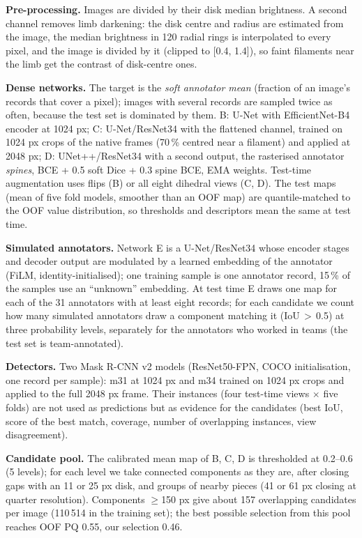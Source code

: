 \documentclass[sigconf]{acmart}
\begin{document}
\textbf{Pre-processing.} Images are divided by their disk median brightness. A second channel removes limb darkening: the disk centre and radius are estimated from the image, the median brightness in 120 radial rings is interpolated to every pixel, and the image is divided by it (clipped to [0.4, 1.4]), so faint filaments near the limb get the contrast of disk-centre ones.

\textbf{Dense networks.} The target is the \emph{soft annotator mean} (fraction of an image's records that cover a pixel); images with several records are sampled twice as often, because the test set is dominated by them. B: U-Net with EfficientNet-B4 encoder at 1024 px; C: U-Net/ResNet34 with the flattened channel, trained on 1024 px crops of the native frames (70\,\% centred near a filament) and applied at 2048 px; D: UNet++/ResNet34 with a second output, the rasterised annotator \emph{spines}, BCE + 0.5 soft Dice + 0.3 spine BCE, EMA weights. Test-time augmentation uses flips (B) or all eight dihedral views (C, D). The test maps (mean of five fold models, smoother than an OOF map) are quantile-matched to the OOF value distribution, so thresholds and descriptors mean the same at test time.

\textbf{Simulated annotators.} Network E is a U-Net/ResNet34 whose encoder stages and decoder output are modulated by a learned embedding of the annotator (FiLM, identity-initialised); one training sample is one annotator record, 15\,\% of the samples use an ``unknown'' embedding. At test time E draws one map for each of the 31 annotators with at least eight records; for each candidate we count how many simulated annotators draw a component matching it (IoU\,$>$\,0.5) at three probability levels, separately for the annotators who worked in teams (the test set is team-annotated).

\textbf{Detectors.} Two Mask R-CNN v2 models (ResNet50-FPN, COCO initialisation, one record per sample): m31 at 1024 px and m34 trained on 1024 px crops and applied to the full 2048 px frame. Their instances (four test-time views $\times$ five folds) are not used as predictions but as evidence for the candidates (best IoU, score of the best match, coverage, number of overlapping instances, view disagreement).

\textbf{Candidate pool.} The calibrated mean map of B, C, D is thresholded at 0.2--0.6 (5 levels); for each level we take connected components as they are, after closing gaps with an 11 or 25 px disk, and groups of nearby pieces (41 or 61 px closing at quarter resolution). Components $\geq$150 px give about 157 overlapping candidates per image (110\,514 in the training set); the best possible selection from this pool reaches OOF PQ 0.55, our selection 0.46.
\end{document}
